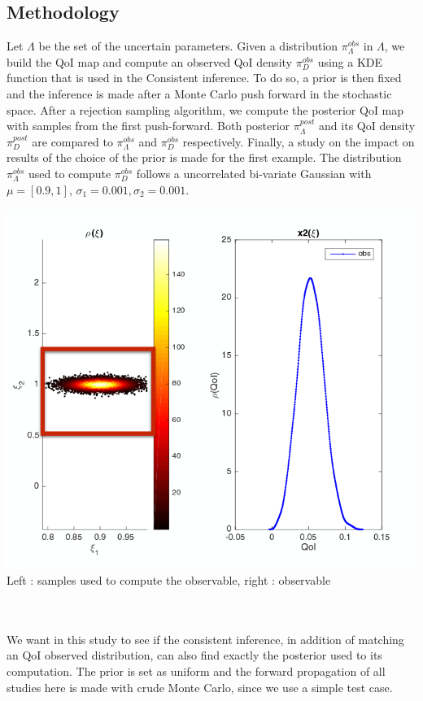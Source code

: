 \documentclass[11pt, a4paper, English]{report}
\begin{document}
\begin{minipage}{0.5\textwidth}
\subsection{Methodology}
Let $\Lambda$ be the set of the uncertain parameters.
Given a distribution $\pi_\Lambda^{obs}$ in $\Lambda$, we build the QoI map and compute an observed QoI density $\pi_D^{obs}$ using a KDE function  that is used in the Consistent inference. To do so, a prior is then fixed and the inference is made after a Monte Carlo push  forward in the stochastic space. After a rejection sampling algorithm, we compute the posterior QoI map with samples from the first push-forward. Both posterior $\pi_\Lambda^{post}$ and its QoI density $\pi_D^{post}$ are compared to $\pi_\Lambda^{obs}$ and $\pi_D^{obs}$ respectively. Finally, a study on the impact on results of the choice of the prior is made for the first example. The distribution $\pi_\Lambda^{obs}$ used to compute $\pi_D^{obs}$ follows a uncorrelated bi-variate Gaussian with $\mu = [0.9, 1]$, $\sigma_1 =0.001, \sigma_2 = 0.001$.
\end{minipage}
\begin{minipage}{0.49\textwidth}
 \includegraphics[width=\textwidth]{observable.png}
 \centering
 Left : samples used to compute the observable, right : observable
\end{minipage}\\\\
We want in this study to see if the consistent inference, in addition of matching an QoI observed distribution, can also find exactly the posterior used to its computation. The prior is set as uniform and the forward propagation of all studies here is made with crude Monte Carlo, since we use a simple test case.
\end{document}
